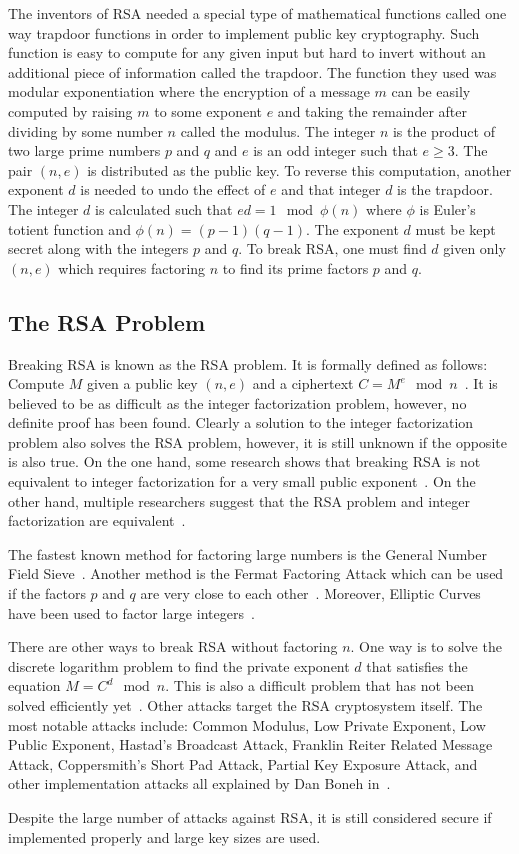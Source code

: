 \documentclass{article}
\begin{document}
The inventors of RSA needed a special type of mathematical functions called one way trapdoor functions in order to implement public key cryptography. Such function is easy to compute for any given input but hard to invert without an additional piece of information called the trapdoor. The function they used was modular exponentiation where the encryption of a message $m$ can be easily computed by raising $m$ to some exponent $e$ and taking the remainder after dividing by some number $n$ called the modulus. The integer $n$ is the product of two large prime numbers $p$ and $q$ and $e$ is an odd integer such that $e \ge 3$. The pair $(n, e)$ is distributed as the public key. To reverse this computation, another exponent $d$ is needed to undo the effect of $e$ and that integer $d$ is the trapdoor. The integer $d$ is calculated such that $ed = 1 \mod \phi{(n)}$ where $\phi$ is Euler's totient function and $\phi{(n)} = (p - 1)(q - 1)$. The exponent $d$ must be kept secret along with the integers $p$ and $q$. To break RSA, one must find $d$ given only $(n, e)$ which requires factoring $n$ to find its prime factors $p$ and $q$. 

\subsection{The RSA Problem}
Breaking RSA is known as the RSA problem. It is formally defined as follows:
Compute $M$ given a public key $(n,e)$ and a ciphertext ${C=M^e \mod n}$~\cite{Rivest2011}. It is believed to be as difficult as the integer factorization problem, however, no definite proof has been found. Clearly a solution to the integer factorization problem also solves the RSA problem, however, it is still unknown if the opposite is also true. On the one hand, some research shows that breaking RSA is not equivalent to integer factorization for a very small public exponent~\cite{Boneh1998}. On the other hand, multiple researchers suggest that the RSA problem and integer factorization are equivalent~\cite{Aggarwal2009,Brown2005}.

The fastest known method for factoring large numbers is the General Number Field Sieve~\cite{Bernstein1993}. Another method is the Fermat Factoring Attack which can be used if the factors $p$ and $q$ are very close to each other~\cite{deWeger2002}. Moreover, Elliptic Curves have been used to factor large integers~\cite{Lenstra1987}.

There are other ways to break RSA without factoring $n$. One way is to solve the discrete logarithm problem to find the private exponent $d$ that satisfies the equation ${M=C^d \mod n}$. This is also a difficult problem that has not been solved efficiently yet~\cite{Odlyzko2000}. Other attacks target the RSA cryptosystem itself. The most notable attacks include: Common Modulus, Low Private Exponent, Low Public Exponent, Hastad's Broadcast Attack, Franklin Reiter Related Message Attack, Coppersmith's Short Pad Attack, Partial Key Exposure Attack, and other implementation attacks all explained by Dan Boneh in~\cite{Boneh1999}.

Despite the large number of attacks against RSA, it is still considered secure if implemented properly and large key sizes are used.
\end{document}
